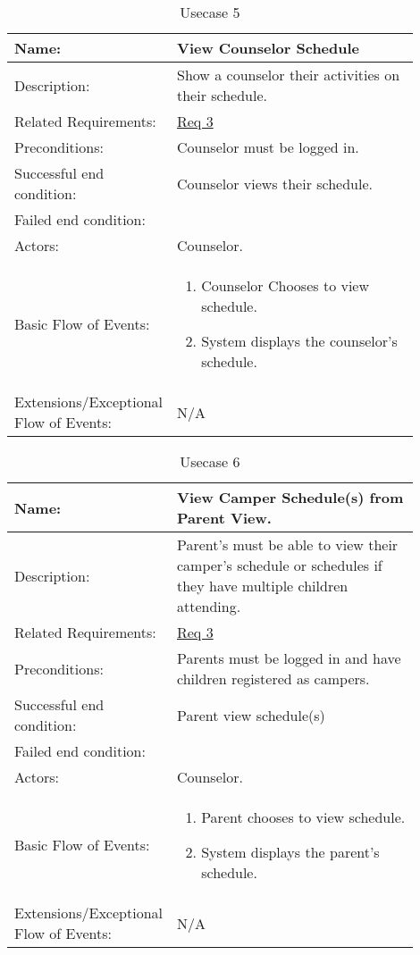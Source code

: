 \documentclass[11pt]{article}
\begin{document}
\begin{table}[!htb]
\caption{Usecase 5}
\label{des:view counselor schedules}
\begin{center}
\begin{tabular}{p{0.30\linewidth}p{0.60\linewidth}}
	Name: & View Counselor Schedule\\\hline
	Description: & Show a counselor their activities on their schedule.\\\hline
	Related Requirements:& \hyperlink{Req3}{Req 3}\\\hline
	Preconditions:& Counselor must be logged in.\\\hline
	Successful end condition:& Counselor views their schedule. \\\hline
	Failed end condition:& \\\hline
	Actors:& Counselor. \\\hline
	Basic Flow of Events: & \begin{enumerate}[topsep=0pt]
		\item Counselor Chooses to view schedule.
		\item System displays the counselor's schedule.
	\end{enumerate}\\\hline
	Extensions/Exceptional Flow of Events: & \vspace*{.25em}  N/A
\end{tabular}
\end{center}
\end{table}

\begin{table}[!htb]
\caption{Usecase 6}
\label{des:view camper schedules}
\begin{center}
\begin{tabular}{p{0.30\linewidth}p{0.60\linewidth}}
	Name: & View Camper Schedule(s) from Parent View.\\\hline
	Description: & Parent's must be able to view their camper's schedule or schedules if they have multiple children attending.\\\hline
	Related Requirements:& \hyperlink{Req3}{Req 3}\\\hline
	Preconditions:& Parents must be logged in and have children registered as campers.\\\hline
	Successful end condition:& Parent view schedule(s) \\\hline
	Failed end condition:& \\\hline
	Actors:& Counselor. \\\hline
	Basic Flow of Events: & \begin{enumerate}[topsep=0pt]
		\item Parent chooses to view schedule.
		\item System displays the parent's schedule.
	\end{enumerate}\\\hline
	Extensions/Exceptional Flow of Events: & \vspace*{.25em}  N/A
\end{tabular}
\end{center}
\end{table}
\end{document}
